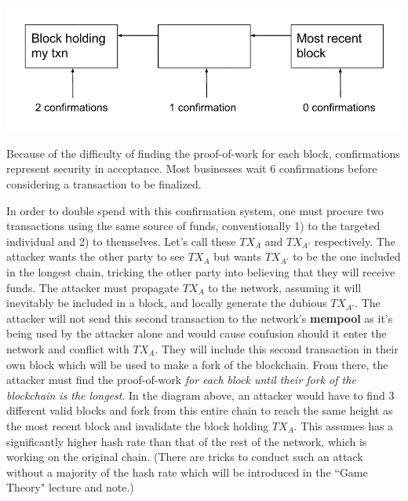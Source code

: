 \documentclass[full.tex]{subfiles}
\begin{document}
  \includegraphics[scale=0.5]{confirmations}
  
  Because of the difficulty of finding the proof-of-work for each block, confirmations represent security in acceptance. Most businesses wait 6 confirmations before considering a transaction to be finalized. 
  
  In order to double spend with this confirmation system, one must procure two transactions using the same source of funds, conventionally 1) to the targeted individual and 2) to themselves. Let's call these $TX_A$ and $TX_{A'}$ respectively. The attacker wants the other party to see $TX_A$ but wants $TX_{A'}$ to be the one included in the longest chain, tricking the other party into believing that they will receive funds. The attacker must propagate $TX_A$ to the network, assuming it will inevitably be included in a block, and locally generate the dubious $TX_{A'}$. The attacker will not send this second transaction to the network's \textbf{mempool} as it's being used by the attacker alone and would cause confusion should it enter the network and conflict with $TX_A$. They will include this second transaction in their own block which will be used to make a fork of the blockchain. From there, the attacker must find the proof-of-work \textit{for each block until their fork of the blockchain is the longest}. In the diagram above, an attacker would have to find 3 different valid blocks and fork from this entire chain to reach the same height as the most recent block and invalidate the block holding $TX_A$. This assumes has a significantly higher hash rate than that of the rest of the network, which is working on the original chain. (There are tricks to conduct such an attack without a majority of the hash rate which will be introduced in the ``Game Theory" lecture and note.)
  
\end{document}
